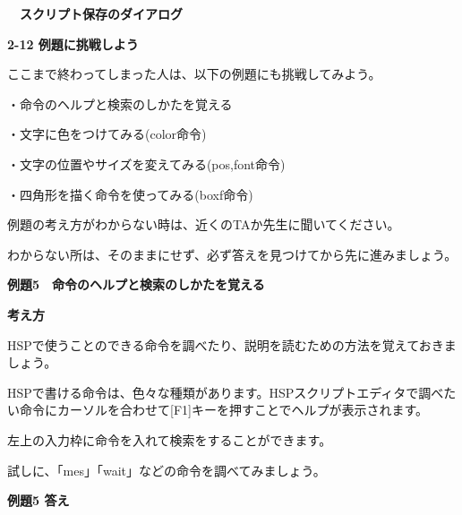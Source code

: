 \documentclass[a4paper,dvipdfmx]{jarticle}
\newcommand\textstyleqwerty[1]{#1}
\begin{document}
\bigskip


\bigskip


\bigskip


\bigskip


\bigskip


\bigskip


\bigskip


\bigskip

{\bfseries
　スクリプト保存のダイアログ}


\bigskip


\bigskip


\bigskip

{\bfseries
2-12 例題に挑戦しよう}


\bigskip

ここまで終わってしまった人は、以下の例題にも挑戦してみよう。


\bigskip

・命令のヘルプと検索のしかたを覚える

・文字に色をつけてみる(color命令)

・文字の位置やサイズを変えてみる(pos,font命令)

・四角形を描く命令を使ってみる(boxf命令)


\bigskip

例題の考え方がわからない時は、近くのTAか先生に聞いてください。

わからない所は、そのままにせず、必ず答えを見つけてから先に進みましょう。


\bigskip


\bigskip

\textstyleqwerty{\textbf{例題5　命令のヘルプと検索のしかたを覚える}}


\bigskip

{\bfseries
考え方}


\bigskip

HSPで使うことのできる命令を調べたり、説明を読むための方法を覚えておきましょう。

HSPで書ける命令は、色々な種類があります。HSPスクリプトエディタで調べたい命令にカーソルを合わせて[F1]キーを押すことでヘルプが表示されます。


\bigskip

左上の入力枠に命令を入れて検索をすることができます。

試しに、「mes」「wait」などの命令を調べてみましょう。


\bigskip


\bigskip

{\bfseries
例題5 答え}


\bigskip
\end{document}
